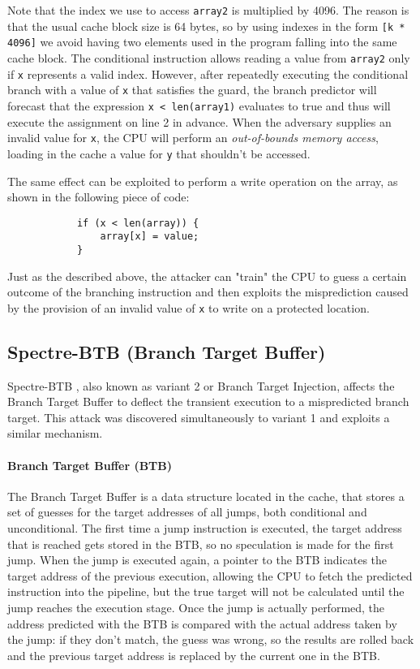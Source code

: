 \documentclass[target=mst,aauheader=aics]{thud}
\theoremstyle{definition}
\begin{document}
	Note that the index we use to access \texttt{array2} is multiplied by 4096. The reason is that the usual cache block size is 64 bytes, so by using indexes in the form \texttt{[k * 4096]} we avoid having two elements used in the program falling into the same cache block.
	The conditional instruction allows reading a value from \texttt{array2} only if \texttt{x} represents a valid index. However, after repeatedly executing the conditional branch with a value of \texttt{x} that satisfies the guard, the branch predictor will forecast that the expression \texttt{x < len(array1)} evaluates to true and thus will execute the assignment on line 2 in advance. When the adversary supplies an invalid value for \texttt{x}, the CPU will perform an \textit{out-of-bounds memory access}, loading in the cache a value for \texttt{y} that shouldn't be accessed.
	
	The same effect can be exploited to perform a write operation on the array, as shown in the following piece of code:
	
	\vspace{3mm}
	\begin{minipage}{.5\textwidth}
		\begin{lstlisting}
			if (x < len(array)) { 
				array[x] = value; 
			}
		\end{lstlisting} 
	\end{minipage}
	
	Just as the described above, the attacker can "train" the CPU to guess a certain outcome of the branching instruction and then exploits the misprediction caused by the provision of an invalid value of \texttt{x} to write on a protected location.
	\subsection{Spectre-BTB (Branch Target Buffer)}\label{sec:spectre-btb}
	Spectre-BTB \cite{Kocher2019} \cite{Canella2019}, also known as variant 2 or Branch Target Injection, affects the Branch Target Buffer to deflect the transient execution to a mispredicted branch target. This attack was discovered simultaneously to variant 1 and exploits a similar mechanism.
	
	\paragraph{Branch Target Buffer (BTB)} The Branch Target Buffer \cite{Perleberg1989} is a data structure located in the cache, that stores a set of guesses for the target addresses of all jumps, both conditional and unconditional. The first time a jump instruction is executed, the target address that is reached gets stored in the BTB, so no speculation is made for the first jump. When the jump is executed again, a pointer to the BTB indicates the target address of the previous execution, allowing the CPU to fetch the  predicted instruction into the pipeline, but the true target will not be calculated until the jump reaches the execution stage. Once the jump is actually performed, the address predicted with the BTB is compared with the actual address taken by the jump: if they don't match, the guess was wrong, so the results are rolled back and the previous target address is replaced by the current one in the BTB.
\end{document}
